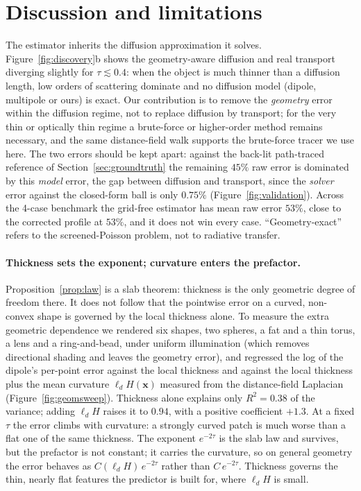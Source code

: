 \documentclass[11pt]{article}
\providecommand{\RMaxRelErr}{0.00}
\providecommand{\RGtCases}{1}
\providecommand{\RGtErrOurs}{0}
\providecommand{\RGtMeanOurs}{0}
\providecommand{\RGtMeanCorr}{0}
\providecommand{\RGswFitTau}{0.00}
\providecommand{\RGswFitCurv}{0.00}
\providecommand{\RGswCoefCurv}{0.0}
\renewcommand{\RMaxRelErr}{0.75}
\renewcommand{\RGtCases}{4}
\renewcommand{\RGtErrOurs}{45}
\renewcommand{\RGtMeanOurs}{53}
\renewcommand{\RGtMeanCorr}{53}
\renewcommand{\RGswFitTau}{0.38}
\renewcommand{\RGswFitCurv}{0.94}
\renewcommand{\RGswCoefCurv}{+1.3}
\newcommand{\ld}{\ell_d}
\begin{document}
\section{Discussion and limitations}
\label{sec:disc2}
The estimator inherits the diffusion approximation it solves. Figure~\ref{fig:discovery}b
shows the geometry-aware diffusion and real transport diverging slightly for
$\tau\lesssim0.4$: when the object is much thinner than a diffusion length, low
orders of scattering dominate and no diffusion model (dipole, multipole or
ours) is exact. Our contribution is to remove the \emph{geometry} error within
the diffusion regime, not to replace diffusion by transport; for the very thin or
optically thin regime a brute-force or higher-order method remains necessary, and
the same distance-field walk supports the brute-force tracer we use here. The two
errors should be kept apart: against the back-lit path-traced reference of
Section~\ref{sec:groundtruth} the remaining $\RGtErrOurs\%$ raw error is
dominated by this \emph{model} error, the gap between diffusion and transport,
since the \emph{solver} error against the closed-form ball is only
$\RMaxRelErr\%$ (Figure~\ref{fig:validation}). Across the \RGtCases-case
benchmark the grid-free estimator has mean raw error $\RGtMeanOurs\%$, close to
the corrected profile at $\RGtMeanCorr\%$, and it does not win every
case. ``Geometry-exact'' refers to the screened-Poisson problem, not to
radiative transfer.

\paragraph{Thickness sets the exponent; curvature enters the prefactor.}
Proposition~\ref{prop:law} is a slab theorem: thickness is the only geometric
degree of freedom there. It does not follow that the pointwise error on a curved,
non-convex shape is governed by the local thickness alone. To measure the extra
geometric dependence we rendered six shapes, two spheres, a fat and a thin torus, a lens and
a ring-and-bead, under uniform illumination (which removes directional shading and
leaves the geometry error), and regressed the log of the dipole's per-point error
against the local thickness and against the local thickness plus the mean
curvature $\ld H(\mathbf{x})$ measured from the distance-field Laplacian
(Figure~\ref{fig:geomsweep}). Thickness alone explains only $R^2=\RGswFitTau$ of
the variance; adding $\ld H$ raises it to $\RGswFitCurv$, with a positive
coefficient $\RGswCoefCurv$. At a fixed $\tau$ the error climbs with curvature: a
strongly curved patch is much worse than a flat one of the same thickness. The
exponent $e^{-2\tau}$ is the slab law and survives, but the prefactor is not
constant; it carries the curvature, so on general geometry the error behaves as
$C(\ld H)\,e^{-2\tau}$ rather than $C\,e^{-2\tau}$. Thickness governs the thin,
nearly flat features the predictor is built for, where $\ld H$ is small.
\end{document}
